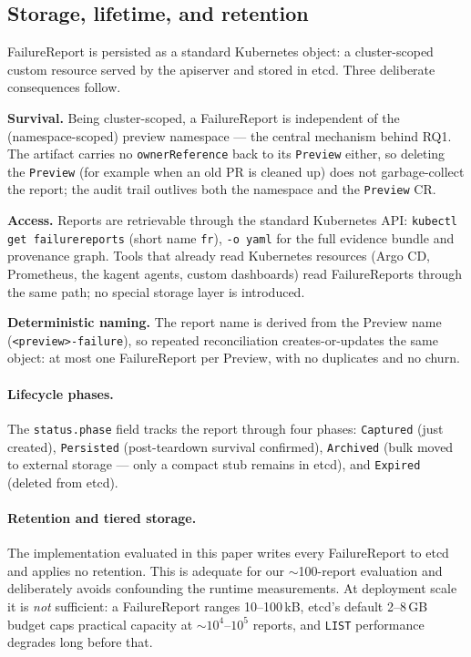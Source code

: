 \documentclass[sigconf, nonacm=true, anonymous=false, review=false]{acmart}
\newcommand{\RQ}[1]{RQ#1\xspace}
\newcommand{\fp}{FailureReport\xspace}
\begin{document}
\subsection{Storage, lifetime, and retention}
\label{sec:approach-storage}

\fp{} is persisted as a standard Kubernetes object: a cluster-scoped
custom resource served by the apiserver and stored in etcd. Three
deliberate consequences follow.

\textbf{Survival.} Being cluster-scoped, a \fp{} is independent of the
(namespace-scoped) preview namespace --- the central mechanism behind
\RQ{1}. The artifact carries no \texttt{ownerReference} back to its
\texttt{Preview} either, so deleting the \texttt{Preview} (for example
when an old PR is cleaned up) does not garbage-collect the report; the
audit trail outlives both the namespace and the \texttt{Preview} CR.

\textbf{Access.} Reports are retrievable through the standard
Kubernetes API: \texttt{kubectl get failurereports} (short name
\texttt{fr}), \texttt{-o yaml} for the full evidence bundle and
provenance graph. Tools that already read Kubernetes resources
(Argo CD, Prometheus, the kagent agents, custom dashboards) read \fp{}s
through the same path; no special storage layer is introduced.

\textbf{Deterministic naming.} The report name is derived from the
Preview name (\texttt{<preview>-failure}), so repeated reconciliation
creates-or-updates the same object: at most one \fp{} per Preview,
with no duplicates and no churn.

\paragraph{Lifecycle phases.} The \texttt{status.phase} field tracks
the report through four phases: \texttt{Captured} (just created),
\texttt{Persisted} (post-teardown survival confirmed),
\texttt{Archived} (bulk moved to external storage --- only a compact
stub remains in etcd), and \texttt{Expired} (deleted from etcd).

\paragraph{Retention and tiered storage.} The implementation evaluated
in this paper writes every \fp{} to etcd and applies no retention.
This is adequate for our $\sim$100-report evaluation and deliberately
avoids confounding the runtime measurements. At deployment scale it is
\emph{not} sufficient: a \fp{} ranges 10--100\,kB, etcd's default
2--8\,GB budget caps practical capacity at $\sim$$10^4$--$10^5$
reports, and \texttt{LIST} performance degrades long before that.
\end{document}

